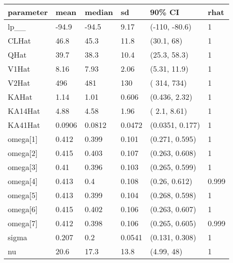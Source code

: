 
\begin{tabular}{l|l|l|l|l|l}
\hline
parameter & mean & median & sd & 90\% CI & rhat\\
\hline
lp\_\_ & -94.9 & -94.5 & 9.17 & (-110, -80.6) & 1\\
\hline
CLHat & 46.8 & 45.3 & 11.8 & (30.1,   68) & 1\\
\hline
QHat & 39.7 & 38.3 & 10.4 & (25.3, 58.3) & 1\\
\hline
V1Hat & 8.16 & 7.93 & 2.06 & (5.31, 11.9) & 1\\
\hline
V2Hat & 496 & 481 & 130 & ( 314,  734) & 1\\
\hline
KAHat & 1.14 & 1.01 & 0.606 & (0.436, 2.32) & 1\\
\hline
KA14Hat & 4.88 & 4.58 & 1.96 & ( 2.1, 8.61) & 1\\
\hline
KA41Hat & 0.0906 & 0.0812 & 0.0472 & (0.0351, 0.177) & 1\\
\hline
omega[1] & 0.412 & 0.399 & 0.101 & (0.271, 0.595) & 1\\
\hline
omega[2] & 0.415 & 0.403 & 0.107 & (0.263, 0.608) & 1\\
\hline
omega[3] & 0.41 & 0.396 & 0.103 & (0.265, 0.599) & 1\\
\hline
omega[4] & 0.413 & 0.4 & 0.108 & (0.26, 0.612) & 0.999\\
\hline
omega[5] & 0.413 & 0.399 & 0.104 & (0.268, 0.598) & 1\\
\hline
omega[6] & 0.415 & 0.402 & 0.106 & (0.263, 0.607) & 1\\
\hline
omega[7] & 0.412 & 0.398 & 0.106 & (0.265, 0.605) & 0.999\\
\hline
sigma & 0.207 & 0.2 & 0.0541 & (0.131, 0.308) & 1\\
\hline
nu & 20.6 & 17.3 & 13.8 & (4.99,   48) & 1\\
\hline
\end{tabular}

